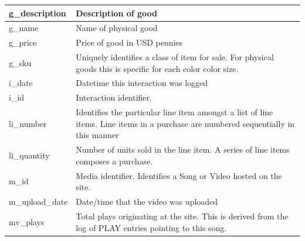 \documentclass[11pt, a4paper]{report}
\begin{document}
\begin{longtable}{|l|p{10cm}|}
g\_description          & Description of good                                                                                                                                                   \\ \hline
g\_name                 & Name of physical good                                                                                                                                                 \\ \hline
g\_price                & Price of good in USD pennies                                                                                                                                          \\ \hline
g\_sku                  & Uniquely identifies a class of item for sale. For physical goods this is specific for each color color size.                                                          \\ \hline
i\_date                 & Datetime this interaction was logged                                                                                                                                  \\ \hline
i\_id                   & Interaction identifier.                                                                                                                                               \\ \hline
li\_number              & Identifies the particular line item amongst a list of line items. Line items in a purchase are numbered sequentially in this manner                                   \\ \hline
li\_quantity            & Number of units sold in the line item. A series of line items composes a purchase.                                                                                    \\ \hline
m\_id                   & Media identifier. Identifies a Song or Video hosted on the site.                                                                                                      \\ \hline
m\_upload\_date         & Date/time that the video was uploaded                                                                                                                              \\ \hline
mv\_plays               & Total plays originating at the site. This is derived from the log of PLAY entries pointing to this song.                                                              \\ \hline

\end{longtable}
\end{document}
